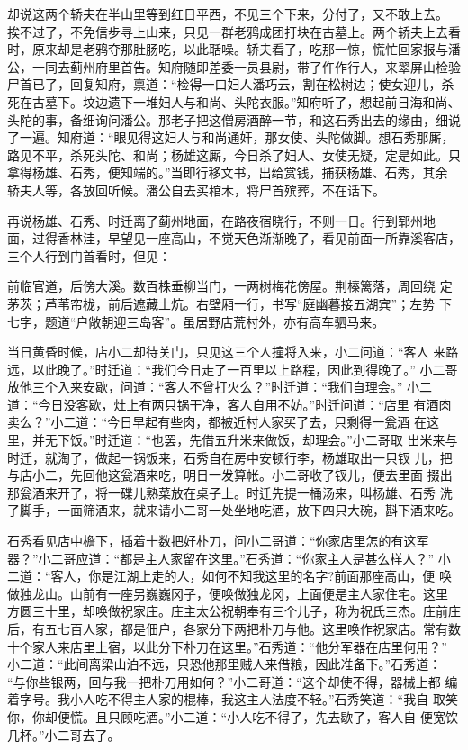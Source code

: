 却说这两个轿夫在半山里等到红日平西，不见三个下来，分付了，又不敢上去。
挨不过了，不免信步寻上山来，只见一群老鸦成团打块在古墓上。两个轿夫上去看
时，原来却是老鸦夺那肚肠吃，以此聒噪。轿夫看了，吃那一惊，慌忙回家报与潘
公，一同去蓟州府里首告。知府随即差委一员县尉，带了仵作行人，来翠屏山检验
尸首已了，回复知府，禀道：“检得一口妇人潘巧云，割在松树边；使女迎儿，杀
死在古墓下。坟边遗下一堆妇人与和尚、头陀衣服。”知府听了，想起前日海和尚、
头陀的事，备细询问潘公。那老子把这僧房酒醉一节，和这石秀出去的缘由，细说
了一遍。知府道：“眼见得这妇人与和尚通奸，那女使、头陀做脚。想石秀那厮，
路见不平，杀死头陀、和尚；杨雄这厮，今日杀了妇人、女使无疑，定是如此。只
拿得杨雄、石秀，便知端的。”当即行移文书，出给赏钱，捕获杨雄、石秀，其余
轿夫人等，各放回听候。潘公自去买棺木，将尸首殡葬，不在话下。

再说杨雄、石秀、时迁离了蓟州地面，在路夜宿晓行，不则一日。行到郓州地
面，过得香林洼，早望见一座高山，不觉天色渐渐晚了，看见前面一所靠溪客店，
三个人行到门首看时，但见：

前临官道，后傍大溪。数百株垂柳当门，一两树梅花傍屋。荆榛篱落，周回绕
定茅茨；芦苇帘栊，前后遮藏土炕。右壁厢一行，书写“庭幽暮接五湖宾”；左势
下七字，题道“户敞朝迎三岛客”。虽居野店荒村外，亦有高车驷马来。

当日黄昏时候，店小二却待关门，只见这三个人撞将入来，小二问道：“客人
来路远，以此晚了。”时迁道：“我们今日走了一百里以上路程，因此到得晚了。”
小二哥放他三个入来安歇，问道：“客人不曾打火么？”时迁道：“我们自理会。”
小二道：“今日没客歇，灶上有两只锅干净，客人自用不妨。”时迁问道：“店里
有酒肉卖么？”小二道：“今日早起有些肉，都被近村人家买了去，只剩得一瓮酒
在这里，并无下饭。”时迁道：“也罢，先借五升米来做饭，却理会。”小二哥取
出米来与时迁，就淘了，做起一锅饭来，石秀自在房中安顿行李，杨雄取出一只钗
儿，把与店小二，先回他这瓮酒来吃，明日一发算帐。小二哥收了钗儿，便去里面
掇出那瓮酒来开了，将一碟儿熟菜放在桌子上。时迁先提一桶汤来，叫杨雄、石秀
洗了脚手，一面筛酒来，就来请小二哥一处坐地吃酒，放下四只大碗，斟下酒来吃。

石秀看见店中檐下，插着十数把好朴刀，问小二哥道：“你家店里怎的有这军
器？”小二哥应道：“都是主人家留在这里。”石秀道：“你家主人是甚么样人？”
小二道：“客人，你是江湖上走的人，如何不知我这里的名字?前面那座高山，便
唤做独龙山。山前有一座另巍巍冈子，便唤做独龙冈，上面便是主人家住宅。这里
方圆三十里，却唤做祝家庄。庄主太公祝朝奉有三个儿子，称为祝氏三杰。庄前庄
后，有五七百人家，都是佃户，各家分下两把朴刀与他。这里唤作祝家店。常有数
十个家人来店里上宿，以此分下朴刀在这里。”石秀道：“他分军器在店里何用？”
小二道：“此间离梁山泊不远，只恐他那里贼人来借粮，因此准备下。”石秀道：
“与你些银两，回与我一把朴刀用如何？”小二哥道：“这个却使不得，器械上都
编着字号。我小人吃不得主人家的棍棒，我这主人法度不轻。”石秀笑道：“我自
取笑你，你却便慌。且只顾吃酒。”小二道：“小人吃不得了，先去歇了，客人自
便宽饮几杯。”小二哥去了。

